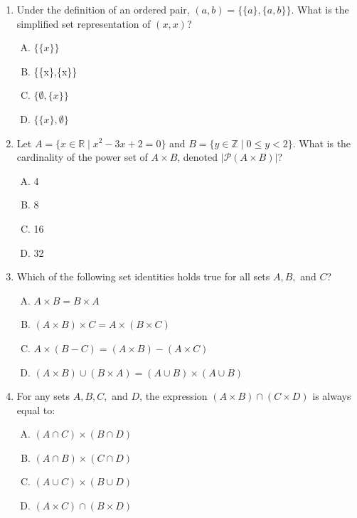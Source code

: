 \documentclass[12pt]{article}
\begin{document}
\begin{enumerate}[1.]
        \item{Under the definition of an ordered pair, $(a,b)=\{\{a\},\{a,b\}\}$. What is the simplified set representation of $(x,x)$?}
            \begin{enumerate}[A.]
                \item{$\{\{x\}\}$}
                \item{\{\{x\},\{x\}\}}
                \item{$\{\emptyset, \{x\}\}$}
                \item{$\{\{x\}, \emptyset\}$}
        \end{enumerate}
        
        \item{Let $A = \{x \in \mathbb{R} \mid x^2 - 3x + 2 = 0\}$ and $B = \{y \in \mathbb{Z} \mid 0 \le y < 2\}$. What is the cardinality of the power set of $A \times B$, denoted $\vert{}\mathcal{P}(A \times B)\vert{}$?}
            \begin{enumerate}[A.]
                \item{4}
                \item{8}
                \item{16}
                \item{32}
            \end{enumerate}

        \item{Which of the following set identities holds true for all sets $A, B,$ and $C$?}
            \begin{enumerate}[A.]
                \item{$A \times B = B \times A$}
                \item{$(A \times B) \times C = A \times (B \times C)$}
                \item{$A \times (B - C) = (A \times B) - (A \times C)$}
                \item{$(A \times B) \cup (B \times A) = (A \cup B) \times (A \cup B)$}
        \end{enumerate}
        \item{For any sets $A, B, C,$ and $D$, the expression $(A \times B) \cap (C \times D)$ is always equal to:}
            \begin{enumerate}[A.]
                \item{$(A \cap C) \times (B \cap D)$}
                \item{$(A \cap B) \times (C \cap D)$}
                \item{$(A \cup C) \times (B \cup D)$}
                \item{$(A \times C) \cap (B \times D)$}
            \end{enumerate}
    \end{enumerate}
\end{document}

